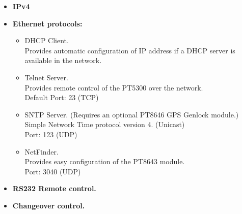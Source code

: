 \begin{itemize}
%	

	\item \textbf{IPv4}
	\item \textbf{Ethernet protocols:}
	\begin{itemize}
		\item DHCP Client. \\Provides automatic configuration of IP address if a DHCP server is available in the network.
		\item Telnet Server. \\Provides remote control of the PT5300 over the network.\\Default Port: 23 (TCP)
		\item SNTP Server. (Requires an optional PT8646 GPS Genlock module.) \\Simple Network Time protocol version 4. (Unicast)\\ Port: 123 (UDP)
		\item NetFinder. \\Provides easy configuration of the PT8643 module.\\ Port: 3040 (UDP)	
	\end{itemize}
	\item \textbf{RS232 Remote control.}
	\item \textbf{Changeover control.}
\end{itemize}


